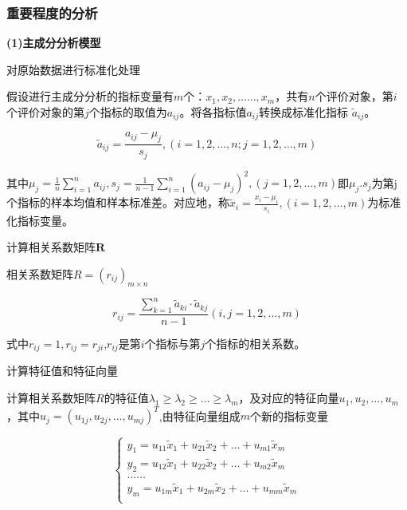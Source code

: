 \documentclass[UTF8]{ctexart}
\begin{document}
	\subsubsection{重要程度的分析}
	\textbf{(1)主成分分析模型} \par 
	[1]对原始数据进行标准化处理\par 
	假设进行主成分分析的指标变量有$m$个：$x_1,x_2,……,x_m$，共有$n$个评价对象，第$i$个评价对象的第$j$个指标的取值为$a_{ij}$。将各指标值$a_{ij}$转换成标准化指标 $\tilde{a}_{ij}$。\par 
	\begin{equation}
		\tilde{a}_{ij}=\frac{a_{ij}-\mu _j}{s_j},\left( i=1,2,…,n;j=1,2,…,m \right) 
	\end{equation}\par
	其中$\mu_j=\frac{1}{n}\sum_{i=1}^n{a_{ij}},s_j=\frac{1}{n-1}\sum_{i=1}^n{\left( a_{ij}-\mu _j \right) ^2},\left( j=1,2,…,m \right)$即$\mu _j.s_j$为第j个指标的样本均值和样本标准差。对应地，称$\tilde{x}_i=\frac{x_i-\mu _i}{s_i},\left( i=1,2,…,m \right) $为标准化指标变量。\par 
	[2]计算相关系数矩阵$\boldsymbol{R}$\par 
	相关系数矩阵$R=\left( r_{ij} \right) _{m\times n}$\par
	\begin{equation}
		r_{ij}=\frac{\sum_{k=1}^n{\tilde{a}_{ki}\cdot}\tilde{a}_{kj}}{n-1}\left( i,j=1,2,…,m \right) 
	\end{equation}\par
	式中$r_{ij}=1,r_{ij}=r_{ji}$,$r_{ij}$是第$i$个指标与第$j$个指标的相关系数。\par
	[3]计算特征值和特征向量\par
	计算相关系数矩阵$R$的特征值$\lambda _1\geq \lambda _2\geq …\geq \lambda _m$，及对应的特征向量$u_1,u_2,…,u_m$，其中$u_j=\left( u_{1j},u_{2j},…,u_{mj} \right) ^T$,由特征向量组成$m$个新的指标变量\par
	\begin{equation}
		\left\{ \begin{array}{c}
			y_1=u_{11}\tilde{x}_1+u_{21}\tilde{x}_2+…+u_{m1}\tilde{x}_m\\
			y_2=u_{12}\tilde{x}_1+u_{22}\tilde{x}_2+…+u_{m2}\tilde{x}_m\\
			……\\
			y_m=u_{1m}\tilde{x}_1+u_{2m}\tilde{x}_2+…+u_{mm}\tilde{x}_m\\
		\end{array} \right. 
	\end{equation}\par
\end{document}
